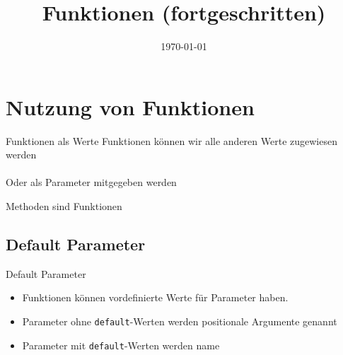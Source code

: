 	


\newcommand{\topic}{
	Funktionen (fortgeschritten)
}

\title{\topic}
\supertitle{\course}
\date{\today}



\maketitle

\begin{frame}
	\tableofcontents
\end{frame}


\section{Nutzung von Funktionen}
\begin{frame}[fragile]{Funktionen als Werte}
Funktionen k\"onnen wir alle anderen Werte zugewiesen werden\\


\ \\[.25cm]
Oder als Parameter mitgegeben werden\\


\end{frame}

\begin{frame}[fragile]{Methoden sind Funktionen}

\end{frame}

\subsection{Default Parameter}
\begin{frame}[fragile]{Default Parameter}
\begin{itemize}
	\item Funktionen k\"onnen vordefinierte Werte für Parameter haben.
	\item Parameter ohne \texttt{default}-Werten werden positionale Argumente genannt
	\item Parameter mit \texttt{default}-Werten werden name
\end{itemize}

\end{frame}

